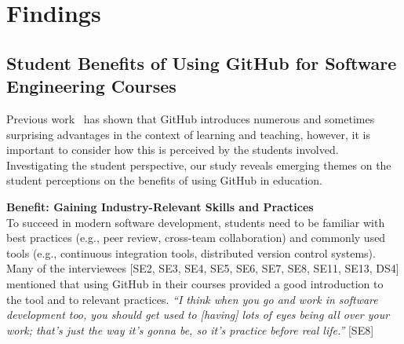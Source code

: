 \section{Findings} %
\label{sec:Findings}


\subsection{Student Benefits of Using GitHub for Software Engineering Courses}
Previous work~\cite{zagalsky2015emergence} has shown that GitHub introduces numerous and sometimes surprising advantages in the context of learning and teaching, however, it is important to consider how this is perceived by the students involved. Investigating the student perspective, our study reveals emerging themes on the student perceptions on the benefits of using GitHub in education.


\textbf{Benefit: Gaining Industry-Relevant Skills and Practices}\\
To succeed in modern software development, students need to be familiar with best practices (e.g., peer review, cross-team collaboration) and commonly used tools (e.g., continuous integration tools, distributed version control systems). Many of the interviewees [SE2, SE3, SE4, SE5, SE6, SE7, SE8, SE11, SE13, DS4] mentioned that using GitHub in their courses provided a good introduction to the tool and to relevant practices. \textit{``I think when you go and work in software development too, you should get used to [having] lots of eyes being all over your work; that's just the way it's gonna be, so it's practice before real life.''} [SE8]


